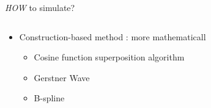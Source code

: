 \documentclass[handout,t]{beamer}
\begin{document}
\begin{frame}[t]{\emph{HOW} to simulate?}
\begin{columns}
\begin{column}{.48\textwidth}
\begin{itemize}
          \begin{itemize}
            [ball]  
            \item Blinn, 1978, Bump Mapping
          \end{itemize}
        \item Construction-based method : more mathematicall
          \begin{itemize}
            [ball]  
            \item Cosine function superposition algorithm
            \item Gerstner Wave
            \item B-spline
          \end{itemize}
      \end{itemize}
    \end{column}%
  \end{columns}
\end{frame}
\end{document}
